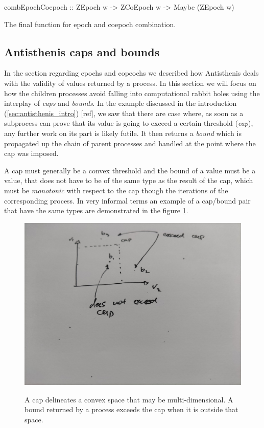 \begin{code}
\begin{haskellcode}
combEpochCoepoch :: ZEpoch w -> ZCoEpoch w -> Maybe (ZEpoch w)
\end{haskellcode}
\label{lst:comb_epoch_coepoch}
\caption{The final function for epoch and coepoch combination.}
\end{code}

\subsection{Antisthenis caps and bounds}
\label{sec:caps_and_bounds}

In the section regarding epochs and copeochs we described how
Antisthenis deals with the validity of values returned by a
process. In this section we will focus on how the children processes
avoid falling into computational rabbit holes using the interplay of
\emph{caps} and \emph{bounds}.  In the example discussed in the
introduction (\ref{sec:antisthenis_intro}) [ref], we saw that there
are case where, as soon as a subprocess can prove that its value is
going to exceed a certain threshold (\emph{cap}), any further work on
its part is likely futile. It then returns a \emph{bound} which is
propagated up the chain of parent processes and handled at the point
where the cap was imposed.

A cap must generally be a convex threshold and the bound of a value
must be a value, that does not have to be of the same type as the
result of the cap, which must be \emph{monotonic} with respect to the
cap though the iterations of the corresponding process. In very
informal terms an example of a cap/bound pair that have the same types
are demonstrated in the figure \ref{fig:2d_cap}.

\begin{figure}[H]
\centering
\includegraphics[width=.9\linewidth]{./imgs/2021-10-11_00-38-22_screenshot.png}
\label{fig:2d_cap}
\caption{A cap delineates a convex space that may be
  multi-dimensional. A bound returned by a process exceeds the cap
  when it is outside that space.}
\end{figure}

